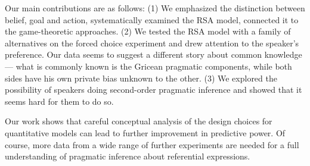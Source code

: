 Our main contributions are as follows: (1) We emphasized the distinction between belief, goal and action, systematically examined the RSA model, connected it to the game-theoretic approaches. (2) We tested the RSA model with a family of alternatives on the forced choice experiment and drew attention to the speaker's preference. Our data seems to suggest a different story about common knowledge --- what is commonly known is the Gricean pragmatic components, while both sides have his own private bias unknown to the other. (3) We explored the possibility of speakers doing second-order pragmatic inference and showed that it seems hard for them to do so. 

Our work shows that careful conceptual analysis of the design choices for quantitative models can lead to further improvement in predictive power. Of course, more data from a wide range of further experiments are needed for a full understanding of pragmatic inference about referential expressions.

